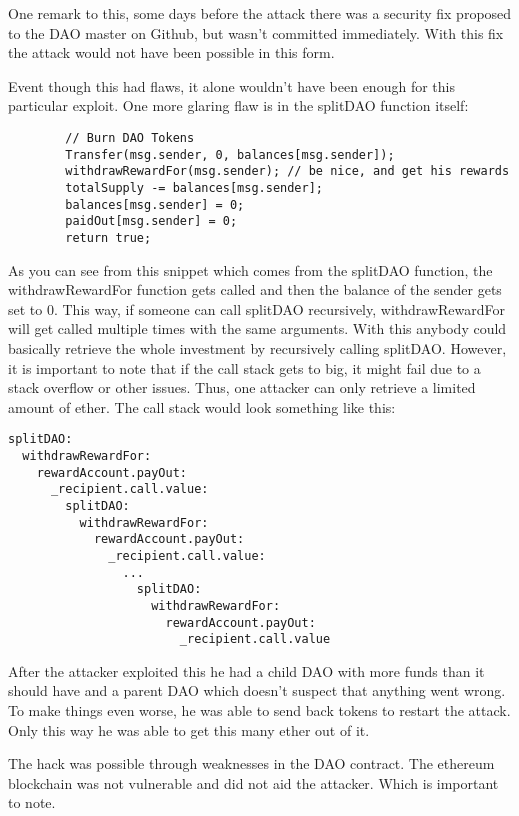 \documentclass[a4paper, 11pt]{scrartcl}
\begin{document}
One remark to this, some days before the attack there was a security fix proposed to the DAO master on Github, but wasn't committed immediately. With this fix the attack would not have been possible in this form. \cite{securityFixPayout}

Event though this had flaws, it alone wouldn't have been enough for this particular exploit. One more glaring flaw is in the splitDAO function itself: \cite{deconstructingDaoAttack}

\begin{verbatim}
        // Burn DAO Tokens
        Transfer(msg.sender, 0, balances[msg.sender]);
        withdrawRewardFor(msg.sender); // be nice, and get his rewards
        totalSupply -= balances[msg.sender];
        balances[msg.sender] = 0;
        paidOut[msg.sender] = 0;
        return true;
\end{verbatim}

As you can see from this snippet which comes from the splitDAO function, the withdrawRewardFor function gets called and then the balance of the sender gets set to 0. This way, if someone can call splitDAO recursively, withdrawRewardFor will get called multiple times with the same arguments. With this anybody could basically retrieve the whole investment by recursively calling splitDAO. However, it is important to note that if the call stack gets to big, it might fail due to a stack overflow or other issues. Thus, one attacker can only retrieve a limited amount of ether. The call stack would look something like this: \cite{deconstructingDaoAttack}

\begin{verbatim}
splitDAO:
  withdrawRewardFor:
    rewardAccount.payOut:
      _recipient.call.value:
        splitDAO:
          withdrawRewardFor:
            rewardAccount.payOut:
              _recipient.call.value:
                ...  
                  splitDAO:
                    withdrawRewardFor:
                      rewardAccount.payOut:
                        _recipient.call.value
\end{verbatim}

After the attacker exploited this he had a child DAO with more funds than it should have and a parent DAO which doesn't suspect that anything went wrong. To make things even worse, he was able to send back tokens to restart the attack. Only this way he was able to get this many ether out of it. \cite{deconstructingDaoAttack}

The hack was possible through weaknesses in the DAO contract. The ethereum blockchain was not vulnerable and did not aid the attacker. Which is important to note. 
\end{document}
